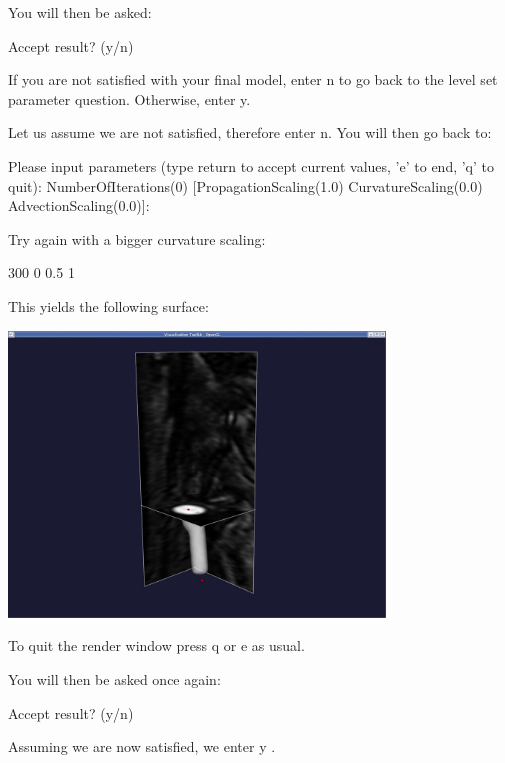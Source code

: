 You will then be asked\+: 
\begin{DoxyCode}
Accept result? (y/n)
\end{DoxyCode}


If you are not satisfied with your final model, enter {\ttfamily n} to go back to the level set parameter question. Otherwise, enter {\ttfamily y}.

Let us assume we are not satisfied, therefore enter {\ttfamily n}. You will then go back to\+:


\begin{DoxyCode}
Please input parameters (type \textcolor{keywordflow}{return} to accept current values, \textcolor{charliteral}{'e'} to
end, \textcolor{charliteral}{'q'} to quit):
 NumberOfIterations(0) [PropagationScaling(1.0) CurvatureScaling(0.0) 
AdvectionScaling(0.0)]:
\end{DoxyCode}


Try again with a bigger curvature scaling\+: 
\begin{DoxyCode}
300 0 0.5 1
\end{DoxyCode}


This yields the following surface\+:

 
\begin{DoxyImageNoCaption}
  \mbox{\includegraphics[width=0.75\textwidth]{curvature0x05}}
\end{DoxyImageNoCaption}


To quit the render window press {\ttfamily q} or {\ttfamily e} as usual.

You will then be asked once again\+: 
\begin{DoxyCode}
Accept result? (y/n)
\end{DoxyCode}


Assuming we are now satisfied, we enter {\ttfamily y} .

